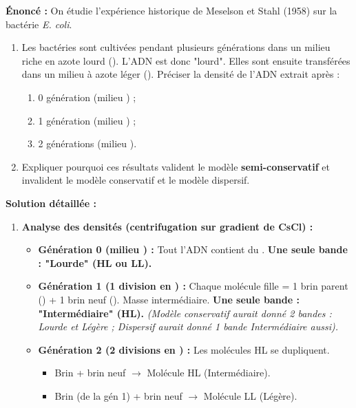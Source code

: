 \documentclass[11pt]{article}
\begin{document}
\begin{exoresolu}
    \textbf{Énoncé :} On étudie l'expérience historique de Meselson et Stahl (1958) sur la bactérie \emph{E. coli}.
    \begin{enumerate}
        \item Les bactéries sont cultivées pendant plusieurs générations dans un milieu riche en azote lourd (). L'ADN est donc "lourd". Elles sont ensuite transférées dans un milieu à azote léger (). Préciser la densité de l'ADN extrait après :
            \begin{enumerate}
                \item 0 génération (milieu ) ;
                \item 1 génération (milieu ) ;
                \item 2 générations (milieu ).
            \end{enumerate}
        \item Expliquer pourquoi ces résultats valident le modèle \textbf{semi-conservatif} et invalident le modèle conservatif et le modèle dispersif.
    \end{enumerate}
    \tcblower
    \textbf{Solution détaillée :}
    \begin{enumerate}
        \item \textbf{Analyse des densités (centrifugation sur gradient de CsCl) :}
            \begin{itemize}
                \item \textbf{Génération 0 (milieu ) :} Tout l'ADN contient du . \textbf{Une seule bande : "Lourde" (HL ou LL).}
                \item \textbf{Génération 1 (1 division en ) :} Chaque molécule fille = 1 brin parent () + 1 brin neuf (). Masse intermédiaire. \textbf{Une seule bande : "Intermédiaire" (HL).} \textit{(Modèle conservatif aurait donné 2 bandes : Lourde et Légère ; Dispersif aurait donné 1 bande Intermédiaire aussi).}
                \item \textbf{Génération 2 (2 divisions en ) :} Les molécules HL se dupliquent.
                    \begin{itemize}
                        \item Brin  + brin  neuf $\rightarrow$ Molécule HL (Intermédiaire).
                        \item Brin  (de la gén 1) + brin  neuf $\rightarrow$ Molécule LL (Légère).

\end{itemize}
\end{itemize}
\end{enumerate}
\end{exoresolu}
\end{document}
